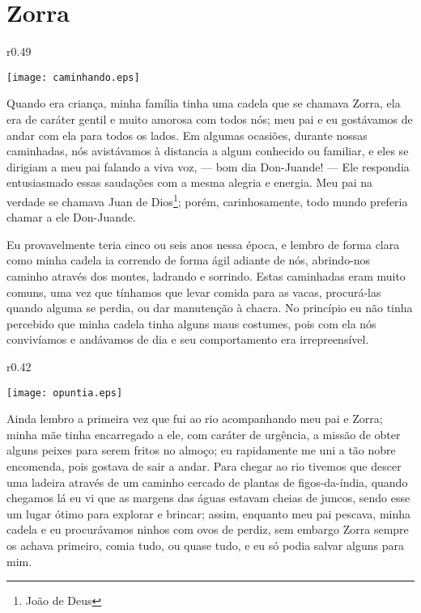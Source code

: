 \cleardoublepage
\newpage
{}
\chapter{Zorra}


\begin{wrapfigure}{r}{0.49\textwidth}
  \begin{center}
  \vspace{-30pt}
    \texttt{[image: caminhando.eps]}
  \end{center}
  \vspace{-20pt}
\end{wrapfigure}
Quando era criança, minha família tinha uma cadela que se chamava Zorra, ela era de caráter gentil e muito amorosa com todos nós; meu pai e eu gostávamos de andar com ela para todos os lados. Em algumas ocasiões, durante nossas caminhadas, nós avistávamos à distancia a algum conhecido ou familiar, e eles se dirigiam a meu pai falando a viva voz, --- bom dia Don-Juande! --- Ele respondia entusiasmado essas saudações com a mesma alegria e energia.
Meu pai na verdade se chamava Juan de Dios\footnote{João de Deus}; porém, carinhosamente, todo mundo preferia chamar a ele Don-Juande.


Eu provavelmente teria cinco ou seis anos nessa época, e lembro de forma clara como minha cadela ia correndo de forma ágil adiante de nós, abrindo-nos caminho através dos montes, ladrando e sorrindo.
Estas caminhadas eram muito comuns, uma vez que tínhamos que levar comida para as vacas, procurá-las quando alguma se perdia, ou dar manutenção à chacra.
No princípio eu não tinha percebido que minha cadela tinha alguns maus costumes, pois com ela nós convivíamos e andávamos de dia e seu comportamento era irrepreensível. 

\begin{wrapfigure}{r}{0.42\textwidth}
  \begin{center}
  \vspace{-30pt}
    \texttt{[image: opuntia.eps]}
  \end{center}
  \vspace{-20pt}
\end{wrapfigure}
Ainda lembro a primeira vez que fui ao rio acompanhando meu pai e Zorra; minha mãe tinha encarregado a ele, com caráter de urgência, a missão de obter alguns peixes para serem fritos no almoço; eu rapidamente me uni a tão nobre encomenda, pois gostava de sair a andar. 
Para chegar ao rio tivemos que descer uma ladeira através de um caminho cercado de plantas de figos-da-índia, quando chegamos lá eu vi que as margens das águas estavam cheias de juncos, sendo esse um lugar ótimo para explorar e brincar; assim, enquanto meu pai pescava, minha cadela e eu procurávamos ninhos com ovos de perdiz, sem embargo Zorra sempre os achava primeiro, comia tudo, ou quase tudo, e eu só podia salvar alguns para mim.


